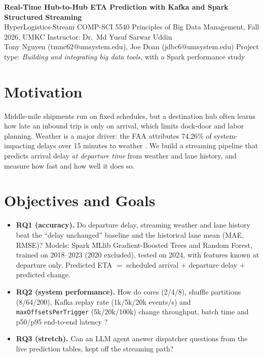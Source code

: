\documentclass[10pt]{article}
\begin{document}
\begin{center}
{\Large\bfseries Real-Time Hub-to-Hub ETA Prediction with Kafka and Spark Structured Streaming}\\[2pt]
{\small HyperLogistics-Stream \textbullet{} COMP-SCI 5540 Principles of Big Data Management, Fall 2026, UMKC \textbullet{} Instructor: Dr.\ Md Yusuf Sarwar Uddin\\
Tony Nguyen (tmnc62@umsystem.edu), Joe Doan (jdbc6@umsystem.edu) \textbullet{} Project type: \emph{Building and integrating big data tools}, with a Spark performance study}
\end{center}
\vspace{-8pt}

\section*{Motivation}
Middle-mile shipments run on fixed schedules, but a destination hub often learns how late an inbound trip is only on arrival, which limits dock-door and labor planning. Weather is a major driver: the FAA attributes 74.26\% of system-impacting delays over 15 minutes to weather \cite{faa}. We build a streaming pipeline that predicts arrival delay \emph{at departure time} from weather and lane history, and measure how fast and how well it does so.

\section*{Objectives and Goals}
\begin{itemize}
\item \textbf{RQ1 (accuracy).} Do departure delay, streaming weather and lane history beat the ``delay unchanged'' baseline and the historical lane mean (MAE, RMSE)? Models: Spark MLlib Gradient-Boosted Trees and Random Forest, trained on 2018--2023 (2020 excluded), tested on 2024, with features known at departure only. Predicted ETA $=$ scheduled arrival $+$ departure delay $+$ predicted change.
\item \textbf{RQ2 (system performance).} How do cores (2/4/8), shuffle partitions (8/64/200), Kafka replay rate (1k/5k/20k events/s) and \texttt{maxOffsetsPerTrigger} (5k/20k/100k) change throughput, batch time and p50/p95 end-to-end latency \cite{karimov,fedorovych}?
\item \textbf{RQ3 (stretch).} Can an LLM agent answer dispatcher questions from the live prediction tables, kept off the streaming path?
\end{itemize}
\end{document}
